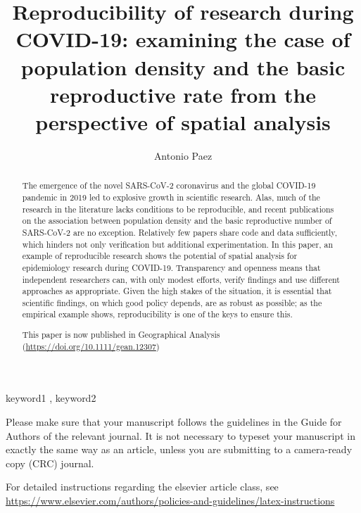 \documentclass[preprint, 3p,
authoryear]{elsarticle} %
\begin{document}
\begin{frontmatter}

  \title{Reproducibility of research during COVID-19: examining the case
of population density and the basic reproductive rate from the
perspective of spatial analysis}
    \author[McMaster University]{Antonio Paez%
  }
  
  \begin{abstract}
  The emergence of the novel SARS-CoV-2 coronavirus and the global
  COVID-19 pandemic in 2019 led to explosive growth in scientific
  research. Alas, much of the research in the literature lacks
  conditions to be reproducible, and recent publications on the
  association between population density and the basic reproductive
  number of SARS-CoV-2 are no exception. Relatively few papers share
  code and data sufficiently, which hinders not only verification but
  additional experimentation. In this paper, an example of reproducible
  research shows the potential of spatial analysis for epidemiology
  research during COVID-19. Transparency and openness means that
  independent researchers can, with only modest efforts, verify findings
  and use different approaches as appropriate. Given the high stakes of
  the situation, it is essential that scientific findings, on which good
  policy depends, are as robust as possible; as the empirical example
  shows, reproducibility is one of the keys to ensure this.

  This paper is now published in Geographical Analysis
  (\url{https://doi.org/10.1111/gean.12307})
  \end{abstract}
    \begin{keyword}
    keyword1 \sep 
    keyword2
  \end{keyword}
  
 \end{frontmatter}

Please make sure that your manuscript follows the guidelines in the
Guide for Authors of the relevant journal. It is not necessary to
typeset your manuscript in exactly the same way as an article, unless
you are submitting to a camera-ready copy (CRC) journal.

For detailed instructions regarding the elsevier article class, see
\url{https://www.elsevier.com/authors/policies-and-guidelines/latex-instructions}

\renewcommand\refname{References}

\end{document}

